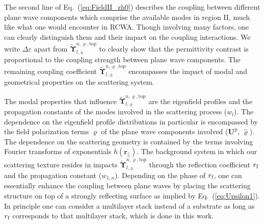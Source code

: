 \documentclass[ floatfix,reprint,amsmath,amssymb,aps,prb]{revtex4-1}
\begin{document}
\begin{widetext}
The second line of Eq.~(\ref{eq:FieldII_zh0}) describes the coupling between different plane wave components which comprise the available modes in region II, much like what one would encounter in RCWA. Though involving many factors, one can clearly distinguish them and their impact on the coupling interactions. We write $\Delta \varepsilon$ apart from $\tilde{\boldsymbol{\Upsilon}}^{ n,\varrho,\mathrm{top}}_{l,\pm} $ to clearly show that the permittivity contrast is proportional to the coupling strength between plane wave components. The remaining coupling coefficient $\tilde{\boldsymbol{\Upsilon}}^{ n,\varrho,\mathrm{top}}_{l,\pm} $ encompasses the impact of modal and geometrical properties on the scattering system. 

The modal properties that influence $\tilde{\boldsymbol{\Upsilon}}^{ n,\varrho,\mathrm{top}}_{l,\pm} $ are the eigenfield profiles and the propagation constants of the modes involved in the scattering process ($w_l$). The dependence on the eigenfield profile distributions in particular is encompassed by the field polarization terms $\varrho$ of the plane wave components involved ($\mathbf{U}^\mathrm{p}$, $\hat{\boldsymbol{\varrho}}$). The dependence on the scattering geometry is contained by the terms involving Fourier transforms of exponentials $h( \mathbf{r_{||} } )$. The background system in which our scattering texture resides in impacts $\tilde{\boldsymbol{\Upsilon}}^{ n,\varrho,\mathrm{top}}_{l,\pm} $ through the reflection coefficient $r_{\textnormal{f}}$ and the propagation constant ($w_{1,n}$). Depending on the phase of $r_{\textnormal{f}}$, one can essentially enhance the coupling between plane waves by placing the scattering structure on top of a strongly reflecting surface as implied by Eq.~(\ref{eq:Upsilon1}). In principle one can consider a multilayer stack instead of a substrate as long as $r_{\textnormal{f}}$ corresponds to that multilayer stack, which is done in this work. 


\end{widetext}
\end{document}
